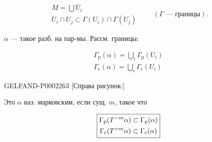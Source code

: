 \begin{equation*}
 \begin{gathered}
 M=\bigcup\overline{U}_i\\
 U_i\cap U_j\subset\Gamma(U_i)\cap\Gamma(U_j)
 \end{gathered}
 \qquad(\Gamma\text{ — границы}).
\end{equation*}



$\alpha$ — такое разб. на пар-мы. Рассм. границы:



\begin{equation*}
 \begin{gathered}
 \Gamma_{\mathrm{p}}(\alpha)=\bigcup_i\Gamma_{\mathrm{p}}(U_i)\\
 \Gamma_{\mathrm{c}}(\alpha)=\bigcup_i\Gamma_{\mathrm{c}}(U_i)
 \end{gathered}
\end{equation*}



\begin{GelfandAdjacentEvidence}{GELFAND-P000226}{3}
[Справа рисунок:]




\end{GelfandAdjacentEvidence}

Это $\alpha$ наз. марковским, если сущ. $m$, такое что



\begin{equation*}
 \fbox{$\begin{gathered}
 \Gamma_{\mathrm{p}}(T^{-m}\alpha)\subset\Gamma_{\mathrm{p}}(\alpha)\\
 \Gamma_{\mathrm{c}}(T^{+m}\alpha)\subset\Gamma_{\mathrm{c}}(\alpha)
 \end{gathered}$}
\end{equation*}



